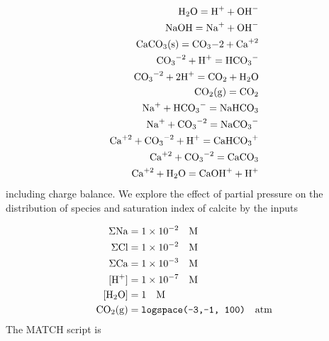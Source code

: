 \documentclass{article}
\begin{document}
\begin{align}
\ce{H2O}   = \ce{H+}  + \ce{OH-} \\
            \ce{NaOH}  = \ce{Na+}  + \ce{OH-} \\
            \ce{CaCO3(s)}  = \ce{CO3-2}  + \ce{Ca^{+2}} \\
            \ce{CO3^{-2}}  + \ce{H+}  = \ce{HCO3-} \\
            \ce{CO3^{-2}}  + 2\ce{H+}  = \ce{CO2}  + \ce{H2O} \\
            \ce{CO2(g)}  = \ce{CO2} \\
            \ce{Na+}  + \ce{HCO3-}  = \ce{NaHCO3} \\
            \ce{Na+}  + \ce{CO3^{-2}}  = \ce{NaCO3-} \\
            \ce{Ca^{+2}}  + \ce{CO3^{-2}}  + \ce{H+}  = \ce{CaHCO3+} \\
            \ce{Ca^{+2}}  + \ce{CO3^{-2}}  = \ce{CaCO3} \\
            \ce{Ca^{+2}}  + \ce{H2O}  = \ce{CaOH+}  + \ce{H+} 
\end{align}
including charge balance. We explore the effect of  partial pressure on the distribution of species and saturation index of calcite by the inputs

\begin{align}
\Sigma \ce{Na} &= 1\times10^{-2} \quad\text{M}\\
\Sigma \ce{Cl} &= 1\times10^{-2} \quad\text{M}\\
\Sigma \ce{Ca} &= 1\times10^{-3} \quad\text{M}\\
[\ce{H+}] &=  1\times10^{-7} \quad\text{M}\\
[\ce{H2O}] & = 1 \quad\text{M}\\
\ce{CO2(g)} &= \texttt{logspace(-3,-1, 100)} \quad\text{atm}\\
\end{align}
The MATCH script is
\end{document}
